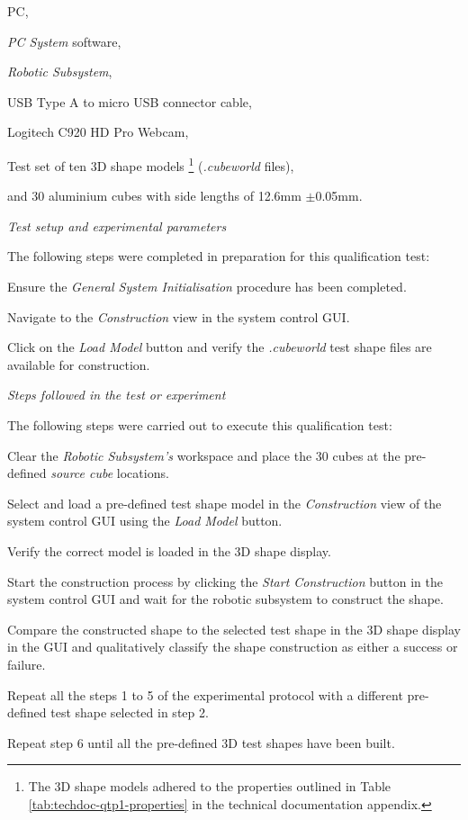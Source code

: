 \begin{compactitem}
	\item PC,
	\item \textit{PC System} software,
	\item \textit{Robotic Subsystem},
	\item USB Type A to micro USB connector cable,
	\item Logitech C920 HD Pro Webcam,
	\item Test set of ten 3D shape models \footnote{The 3D shape models adhered to the properties outlined in Table \ref{tab:techdoc-qtp1-properties} in the technical documentation appendix.} (\textit{.cubeworld} files),
	\item and 30 aluminium cubes with side lengths of 12.6mm $\pm$0.05mm.
\end{compactitem}

\textit{Test setup and experimental parameters}

The following steps were completed in preparation for this qualification test:

\begin{compactenum}
	\item Ensure the \textit{General System Initialisation} procedure has been completed.
	\item Navigate to the \textit{Construction} view in the system control GUI.
	\item Click on the \textit{Load Model} button and verify the \textit{.cubeworld} test shape files are available for construction.
\end{compactenum}

\textit{Steps followed in the test or experiment}

The following steps were carried out to execute this qualification test:

\begin{compactenum}
	\item Clear the \textit{Robotic Subsystem's} workspace and place the 30 cubes at the pre-defined \textit{source cube} locations.
	\item Select and load a pre-defined test shape model in the \textit{Construction} view of the system control GUI using the \textit{Load Model} button.
	\item Verify the correct model is loaded in the 3D shape display.
	\item Start the construction process by clicking the \textit{Start Construction} button in the system control GUI and wait for the robotic subsystem to construct the shape.
	\item Compare the constructed shape to the selected test shape in the 3D shape display in the GUI and qualitatively classify the shape construction as either a success or failure.
	\item Repeat all the steps 1 to 5 of the experimental protocol with a different pre-defined test shape selected in step 2. 
	\item Repeat step 6 until all the pre-defined 3D test shapes have been built.
\end{compactenum}

